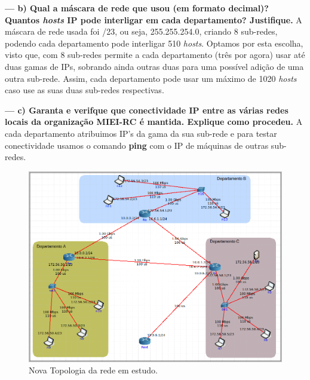 \documentclass[a4paper]{article}
\begin{document}
\vspace{1cm}

\textbf{--- b) Qual a máscara de rede que usou (em formato decimal)? Quantos \textit{hosts} IP pode interligar em cada departamento? Justifique.}\newline
A máscara de rede usada foi /23, ou seja, 255.255.254.0, criando 8 sub-redes, podendo cada departamento pode interligar 510 \textit{hosts}. Optamos por esta escolha, visto que, com 8 sub-redes permite a cada departamento (três por agora) usar até duas gamas de IPs, sobrando ainda outras duas para uma possível adição de uma outra sub-rede. Assim, cada departamento pode usar um máximo de 1020 \textit{hosts} caso use as suas duas sub-redes respectivas.

\newpage

\textbf{--- c) Garanta e verifque que conectividade IP entre as várias redes locais da organização MIEI-RC é mantida. Explique como procedeu.}\newline
A cada departamento atribuimos IP's da gama da sua sub-rede e para testar conectividade usamos o comando \textbf{ping} com o IP de máquinas de outras sub-redes.
\begin{figure}[h]
    \centering
    \includegraphics[scale=0.5]{parte2/nova-topo-cores.png}\newline
    \caption{Nova Topologia da rede em estudo.}
    \label{fig:my_label}
\end{figure}
\end{document}
